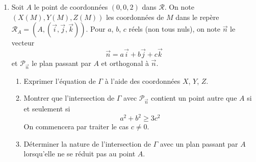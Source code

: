 \begin{enumerate}
 \item Soit $A$ le point de coordonnées $(0,0,2)$ dans $\mathcal{R}$.\newline
 On note $(X(M),Y(M),Z(M))$ les coordonnées de $M$ dans le repère $\mathcal R _A = (A,(\overrightarrow i ,\overrightarrow j ,\overrightarrow k))$. Pour $a$, $b$, $c$ réels (non tous nuls), on note $\overrightarrow n$ le vecteur
\begin{displaymath}
 \overrightarrow n = a\overrightarrow i + b\overrightarrow j + c\overrightarrow k 
\end{displaymath}
et $\mathcal P_{\overrightarrow n}$ le plan passant par $A$ et orthogonal à $\overrightarrow n$.
\begin{enumerate}
 \item Exprimer l'équation de $\Gamma$ à l'aide des coordonnées $X$, $Y$, $Z$.
 \item Montrer que l'intersection de $\Gamma$ avec $\mathcal P_{\overrightarrow n}$ contient un point autre que $A$ si et seulement si
\begin{displaymath}
 a^2 + b^2 \geq 3c^2
\end{displaymath}
 On commencera par traiter le cas $c\neq 0$.
 \item  Déterminer la nature de l'intersection de $\Gamma$ avec un plan passant par $A$ lorsqu'elle ne se réduit pas au point $A$.
\end{enumerate}

\end{enumerate}
